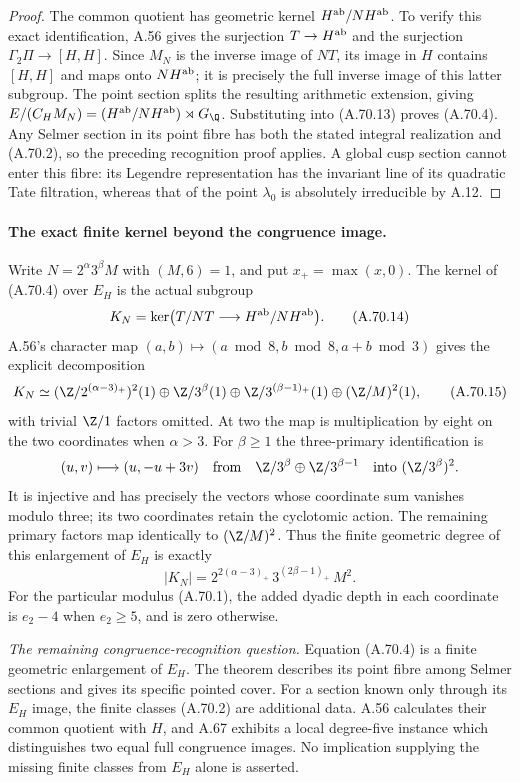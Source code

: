 \begin{proof}
The common quotient has geometric kernel
$H^{\rm ab}/NH^{\rm ab}$.
To verify this exact identification, A.56 gives
the surjection $T\to H^{\rm ab}$ and the
surjection $\Gamma_2\Pi\to[H,H]$.
Since $M_N$ is the inverse image of $NT$, its
image in $H$ contains $[H,H]$ and maps onto
$NH^{\rm ab}$; it is precisely the full inverse
image of this latter subgroup.
The point section splits the resulting arithmetic
extension, giving
$E/(C_HM_N)=(H^{\rm ab}/NH^{\rm ab})\rtimes G_\Q$.
Substituting into (A.70.13) proves (A.70.4).
Any Selmer section in its point fibre has both
the stated integral realization and (A.70.2),
so the preceding recognition proof applies.
A global cusp section cannot enter this fibre:
its Legendre representation has the invariant line
of its quadratic Tate filtration, whereas that of
the point $\lambda_0$ is absolutely irreducible by A.12.
\end{proof}

\paragraph{The exact finite kernel beyond the congruence image.}
Write $N=2^\alpha3^\beta M$ with $(M,6)=1$, and put
$x_+=\max(x,0)$.
The kernel of (A.70.4) over $E_H$ is the actual subgroup
\[
 K_N=\ker\bigl(T/NT\longrightarrow
                         H^{\rm ab}/NH^{\rm ab}\bigr).
\tag{A.70.14}
\]
A.56's character map
$(a,b)\mapsto(a\bmod8,b\bmod8,a+b\bmod3)$
gives the explicit decomposition
\[
 K_N\simeq
 (\Z/2^{(\alpha-3)_+})^2(1)
 \oplus\Z/3^\beta(1)
 \oplus\Z/3^{(\beta-1)_+}(1)
 \oplus(\Z/M)^2(1),
\tag{A.70.15}
\]
with trivial $\Z/1$ factors omitted.
At two the map is multiplication by eight on the
two coordinates when $\alpha>3$.
For $\beta\ge1$ the three-primary identification is
\[
 (u,v)\longmapsto(u,-u+3v)
 \quad\text{from}\quad
 \Z/3^\beta\oplus\Z/3^{\beta-1}
                   \quad\text{into }(\Z/3^\beta)^2.
\]
It is injective and has precisely the vectors whose
coordinate sum vanishes modulo three; its two
coordinates retain the cyclotomic action.
The remaining primary factors map identically to
$(\Z/M)^2$.  Thus the finite geometric degree of
this enlargement of $E_H$ is exactly
\[
                       |K_N|=
       2^{2(\alpha-3)_+}\,3^{(2\beta-1)_+}\,M^2.
\tag{A.70.16}
\]
For the particular modulus (A.70.1), the added
dyadic depth in each coordinate is $e_2-4$ when
$e_2\ge5$, and is zero otherwise.

\noindent\emph{The remaining congruence-recognition question.}
Equation (A.70.4) is a finite geometric enlargement
of $E_H$.  The theorem describes its point fibre
among Selmer sections and gives its specific
pointed cover.
For a section known only through its $E_H$ image,
the finite classes (A.70.2) are additional data.
A.56 calculates their common quotient with $H$,
and A.67 exhibits a local degree-five instance
which distinguishes two equal full congruence
images.  No implication supplying the missing
finite classes from $E_H$ alone is asserted.
